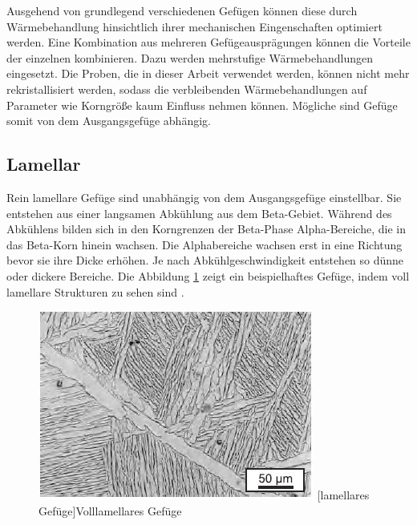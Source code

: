 \documentclass[a4paper, 11pt]{tubsreprt}
\begin{document}
Ausgehend von grundlegend verschiedenen Gefügen können diese durch Wärmebehandlung hinsichtlich ihrer mechanischen Eingenschaften optimiert werden. Eine Kombination aus mehreren Gefügeausprägungen können die Vorteile der einzelnen kombinieren. Dazu werden mehrstufige Wärmebehandlungen eingesetzt. Die Proben, die in dieser Arbeit verwendet werden, können nicht mehr rekristallisiert werden, sodass die verbleibenden Wärmebehandlungen auf Parameter wie Korngröße kaum Einfluss nehmen können. Mögliche sind Gefüge somit von dem Ausgangsgefüge abhängig.  
\subsection{Lamellar} \label{section Gefüge Lamellar}
Rein lamellare Gefüge sind unabhängig von dem Ausgangsgefüge einstellbar. Sie entstehen aus einer langsamen Abkühlung aus dem Beta-Gebiet. Während des Abkühlens bilden sich in den Korngrenzen der Beta-Phase Alpha-Bereiche, die in das Beta-Korn hinein wachsen. Die Alphabereiche wachsen erst in eine Richtung bevor sie ihre Dicke erhöhen. Je nach Abkühlgeschwindigkeit entstehen so dünne oder dickere Bereiche. Die Abbildung \ref{lamellar} zeigt ein beispielhaftes Gefüge, indem voll lamellare Strukturen zu sehen sind \cite{Luetjering2007}.


\begin{figure}
	\centering
		\includegraphics[scale=1]{Bilder/lamellar.jpg}
		[lamellares Gefüge]{Volllamellares Gefüge \cite{Leyens2002}}
		\label{lamellar}
		
\end{figure}
\end{document}
